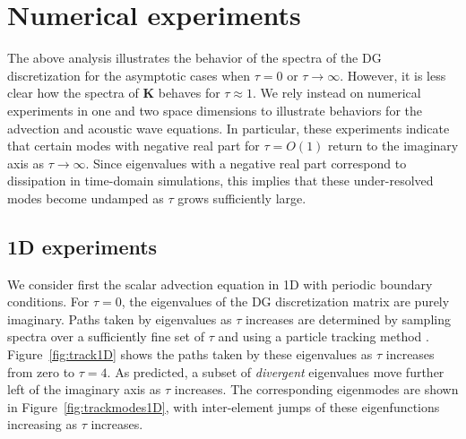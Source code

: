 \documentclass[10pt]{article}
\begin{document}
\section{Numerical experiments}

The above analysis illustrates the behavior of the spectra of the DG discretization for the asymptotic cases when $\tau = 0$ or $\tau \rightarrow \infty$.  However, it is less clear how the spectra of $\bm{K}$ behaves for $\tau \approx 1$.  We rely instead on numerical experiments in one and two space dimensions to illustrate behaviors for the advection and acoustic wave equations.  In particular, these experiments indicate that certain modes with negative real part for $\tau = O(1)$ return to the imaginary axis as $\tau \rightarrow \infty$.  Since eigenvalues with a negative real part correspond to dissipation in time-domain simulations, this implies that these under-resolved modes become undamped as $\tau$ grows sufficiently large.  

\subsection{1D experiments}

We consider first the scalar advection equation in 1D with periodic boundary conditions.  For $\tau = 0$, the eigenvalues of the DG discretization matrix are purely imaginary.  Paths taken by eigenvalues as $\tau$ increases are determined by sampling spectra over a sufficiently fine set of $\tau$ and using a particle tracking method \cite{simpletracker}.  Figure~\ref{fig:track1D} shows the paths taken by these eigenvalues as $\tau$ increases from zero to $\tau = 4$.  As predicted, a subset of \emph{divergent} eigenvalues move further left of the imaginary axis as $\tau$ increases.  The corresponding eigenmodes are shown in Figure~\ref{fig:trackmodes1D}, with inter-element jumps of these eigenfunctions increasing as $\tau$ increases.  
\end{document}
